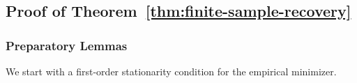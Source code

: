\documentclass[sn-mathphys-num]{sn-jnl}%
\numberwithin{equation}{section}
\newcommand{\norm}[1]{\left\|{#1}\right\|} %
\newcommand{\Range}{{\rm Range}}
\theoremstyle{thmstyleone}%
\newtheorem{theorem}{Theorem}%
\theoremstyle{thmstyletwo}%
\theoremstyle{thmstylethree}%
\begin{document}

%


\subsection{Proof of Theorem~\ref{thm:finite-sample-recovery}}
\subsubsection{Preparatory Lemmas}

\indent\indent
We start with a first-order stationarity condition for the empirical minimizer. 
\end{document}
